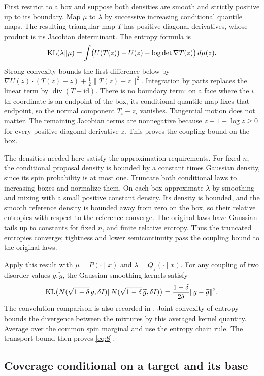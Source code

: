 First restrict to a box and suppose both densities are smooth and
strictly positive up to its boundary. Map $\mu$ to $\lambda$ by
successive increasing conditional quantile maps. The resulting
triangular map $T$ has positive diagonal derivatives, whose product
is its Jacobian determinant. The entropy formula is
\[
 {\rm KL}(\lambda\Vert\mu)
 =\int\bigl(U(T(z))-U(z)-\log\det\nabla T(z)\bigr)\,d\mu(z).
\]
Strong convexity bounds the first difference below by
$\nabla U(z)\cdot(T(z)-z)+\tfrac12\|T(z)-z\|^2$.
Integration by parts replaces the linear term by
$\operatorname{div}(T-\mathrm{id})$. There is no boundary term:
on a face where the $i$th coordinate is an endpoint of the box,
its conditional quantile map fixes that endpoint, so the normal
component $T_i-z_i$ vanishes. Tangential motion does not matter.
The remaining Jacobian terms are nonnegative because
$z-1-\log z\ge0$ for every positive diagonal derivative $z$.
This proves the coupling bound on the box.

The densities needed here satisfy the approximation requirements.
For fixed $n$, the conditional proposal density is bounded by a
constant times Gaussian density, since its spin probability is at
most one. Truncate both conditional laws to increasing boxes and
normalize them. On each box approximate $\lambda$ by smoothing and
mixing with a small positive constant density. Its density is bounded,
and the smooth reference density is bounded away from zero on the
box, so their relative entropies with respect to the reference converge.
The original laws have Gaussian tails up to constants for fixed $n$,
and finite relative entropy.
Thus the truncated entropies converge; tightness and lower
semicontinuity pass the coupling bound to the original laws.

Apply this result with $\mu=P(\cdot\mid x)$ and
$\lambda=Q_f(\cdot\mid x)$. For any coupling of two disorder
values $g,\widetilde g$, the Gaussian smoothing kernels satisfy
\[
 {\rm KL}\bigl(N(\sqrt{1-\delta}\,g,\delta I)
       \Vert N(\sqrt{1-\delta}\,\widetilde g,\delta I)\bigr)
 =\frac{1-\delta}{2\delta}\|g-\widetilde g\|^2.
\]
The convolution comparison is also recorded in
\cite[Lemma~11]{LugosiNeu2022}. Joint convexity of entropy bounds
the divergence between the mixtures by this averaged kernel
quantity. Average over the common spin marginal and use the entropy
chain rule. The transport bound then proves \eqref{eq:8}.

\subsection{Coverage conditional on a target and its base}

